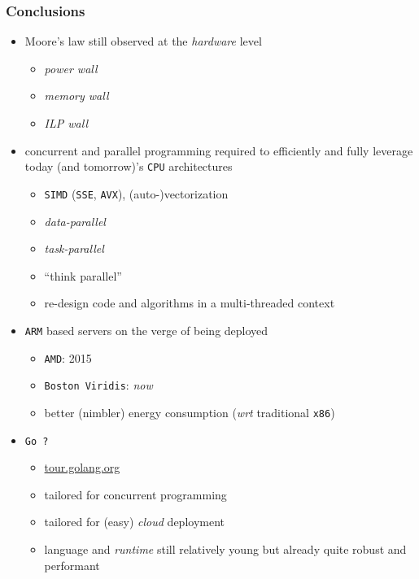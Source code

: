 \documentclass[9pt]{beamer}
\newcommand{\mypurple}[1]{{\color[rgb]{0.7,0,0.8}#1}}
\newcommand{\myred}  [1] {{\color{red}#1}}
\begin{document}
\begin{frame}[fragile]
\frametitle{Conclusions}


\begin{itemize}
\item Moore's law still observed at the \emph{hardware} level
\begin{itemize}
\item \emph{power wall}
\item \emph{memory wall}
\item \emph{ILP wall}
\end{itemize}
\item \myred{concurrent} and \myred{parallel} programming required to
  efficiently and fully leverage today (and tomorrow)'s \texttt{CPU} architectures
\begin{itemize}
\item \verb~SIMD~ (\verb~SSE~, \verb~AVX~), (auto-)vectorization
\item \emph{data-parallel}
\item \emph{task-parallel}
\item \myred{``think parallel''}
  \item \myred{re-design} code and algorithms in a
    \mypurple{multi-threaded} context
\end{itemize}

\item \verb~ARM~ based servers on the verge of being deployed
\begin{itemize}
\item \verb~AMD~: 2015
\item \verb~Boston Viridis~: \emph{now}
\item better (nimbler) energy consumption (\emph{wrt} traditional \texttt{x86})
\end{itemize}
\item \mypurple{\texttt{Go ?}}
\begin{itemize}
\item \href{http://tour.golang.org}{{\color{blue}tour.golang.org}}
\item tailored for concurrent programming
\item tailored for (easy) \emph{cloud} deployment
\item language and  \emph{runtime} still relatively young but already
  quite robust and performant
\end{itemize}
\end{itemize}
\end{frame}

\end{document}
